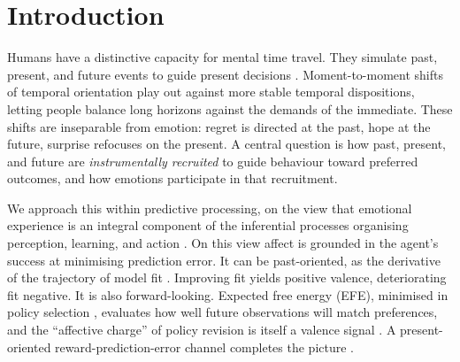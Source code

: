 \documentclass[11pt,a4paper]{article}
\begin{document}
\begin{abstract}
established in the simulated phenotypes (recall collapse, future fixation under stress,
a diathesis-stress mood attractor, all robust across a sweep of the hand-set
constants) rather than in affect prediction. On a static gamble the readout recovers
the standard happiness equation ($n=14{,}803$ held out) where each predecessor channel
alone falls short, reaching that level without injecting expected value as a regressor
(the forward channel supplies it by construction, a $+30\%$ gain over a
reward-prediction-error channel). A counterfactual regret term reproduces part of the
human tendency to switch after a loss when the foregone option was better
($t=10.4$, replicated on a second dataset): a factual learner generates less than half
of that contrast, counterfactual mechanisms most of it, at no gain in held-out choice
likelihood. A mood layer's diathesis-stress prediction holds in independent data,
where a baseline vulnerability trait both lowers mood and amplifies affective
stress-reactivity (interaction $t=4.2$), the same conjunction that in simulation
collapses into a self-sustaining low-mood attractor. An earlier claim that the latent
frame tracks an unshown worry item is withdrawn: the item was in the input, and the
association is null after controls. Throughout we separate predictive claims from
generative ones.
\end{abstract}

\tableofcontents

\section{Introduction}\label{sec:intro}
Humans have a distinctive capacity for mental time travel. They simulate past,
present, and future events to guide present decisions
\citep{suddendorf-corballis1997,schacter-addis2007}. Moment-to-moment shifts of
temporal orientation play out against more stable temporal dispositions, letting
people balance long horizons against the demands of the immediate. These shifts are
inseparable from emotion: regret is directed at the past, hope at the future,
surprise refocuses on the present. A central question is how past, present, and
future are \emph{instrumentally recruited} to guide behaviour toward preferred
outcomes, and how emotions participate in that recruitment.

We approach this within predictive processing, on the view that emotional
experience is an integral component of the inferential processes organising
perception, learning, and action \citep{barrett2017theory,seth2016interoceptive}.
On this view affect is grounded in the agent's success at minimising prediction
error. It can be past-oriented, as the derivative of the trajectory of model fit
\citep{joffily2013emotional}. Improving fit yields positive valence, deteriorating
fit negative. It is also forward-looking. Expected free energy (EFE), minimised in
policy selection \citep{parr2022active}, evaluates how well future observations
will match preferences, and the ``affective charge'' of policy revision is itself a
valence signal \citep{hesp2021deeply}. A present-oriented reward-prediction-error
channel completes the picture \citep{pattisapu2024free}.
\end{document}
